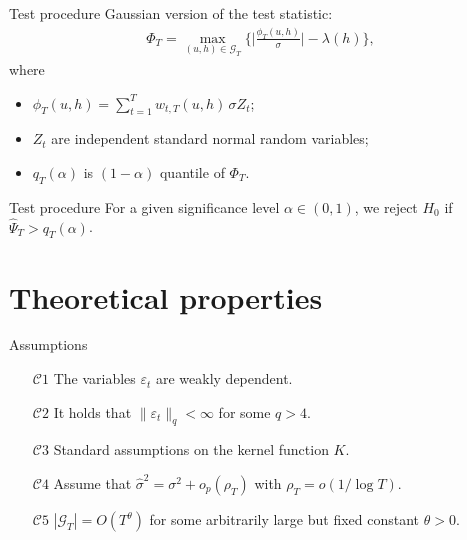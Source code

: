 \documentclass[10pt]{beamer}
\begin{document}
\begin{frame}{Test procedure}
Gaussian version of the test statistic:
\begin{align*}
\Phi_T = \max_{(u,h) \in \mathcal{G}_T} \Big\{ \Big|\frac{\phi_T(u,h)}{\sigma}\Big| - \lambda(h) \Big\},
\end{align*} 
\vspace{-3mm}
where
\begin{itemize}
\item $\phi_T(u,h) = \sum\nolimits_{t=1}^T w_{t,T}(u,h) \, \sigma Z_t$;
\item $Z_t$ are independent standard normal random variables;
\item $q_T(\alpha)$ is $(1 - \alpha)$ quantile of $\Phi_T$.
\end{itemize}\pause
\begin{block}{Test procedure}
For a given significance level $\alpha \in (0,1)$, we reject $H_0$ if $\widehat{\Psi}_T > q_T(\alpha)$.
\end{block}
\end{frame}

\section{Theoretical properties}
\begin{frame}{Assumptions}
\begin{itemize}
\item[$\mathcal{C}1$] \label{C-err1} The variables $\varepsilon_t$ are weakly dependent.
\item[$\mathcal{C}2$] \label{C-err2} It holds that $\| \varepsilon_t \|_q < \infty$ for some $q > 4$.
\item[$\mathcal{C}3$] \label{C-ker} Standard assumptions on the kernel function $K$.
\item[$\mathcal{C}4$] Assume that  $\widehat{\sigma}^2 = \sigma^2 + o_p(\rho_T)$ with $\rho_T = o(1/\log T)$.
\item[$\mathcal{C}5$] \label{C-grid} $|\mathcal{G}_T| = O(T^\theta)$ for some arbitrarily large but fixed constant $\theta > 0$.
\end{itemize}
\end{frame}
\end{document}
